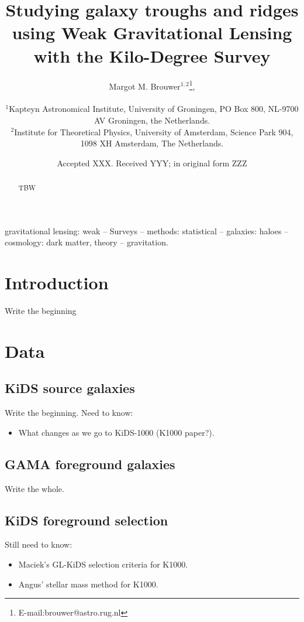 \documentclass[fleqn,usenatbib]{mnras}
\title[Trough and Ridge Lensing with KiDS]{Studying galaxy troughs and ridges using Weak Gravitational Lensing with the Kilo-Degree Survey}
\author[M. M. Brouwer et al.]{Margot M. Brouwer$^{1,2}$\thanks{E-mail:brouwer@astro.rug.nl},
	\\
	\\
	$^{1}$Kapteyn Astronomical Institute, University of Groningen, PO Box 800, NL-9700 AV Groningen, the Netherlands.\\
	$^{2}$Institute for Theoretical Physics, University of Amsterdam, Science Park 904, 1098 XH Amsterdam, The Netherlands. \\
}
\date{Accepted XXX. Received YYY; in original form ZZZ}
\begin{document}
\label{firstpage}
\pagerange{\pageref{firstpage}--\pageref{lastpage}}
\maketitle

\begin{abstract}
TBW
\end{abstract}


\begin{keywords}
gravitational lensing: weak -- Surveys -- methods: statistical -- galaxies: haloes -- cosmology: dark matter, theory -- gravitation.
\\
\end{keywords}

\clearpage




\section{Introduction}
\label{sec:introduction}
Write the beginning

\section{Data}
\label{sec:data}

\subsection{KiDS source galaxies}
\label{sec:kids}
Write the beginning.
Need to know:
\begin{itemize}
	\item What changes as we go to KiDS-1000 (K1000 paper?).
\end{itemize}

\subsection{GAMA foreground galaxies}
\label{sec:gama}
Write the whole.

\subsection{KiDS foreground selection}
\label{sec:gamalike_kids}
Still need to know:
\begin{itemize}
	\item Maciek's GL-KiDS selection criteria for K1000.
	\item Angus' stellar mass method for K1000.
\end{itemize}
\end{document}
